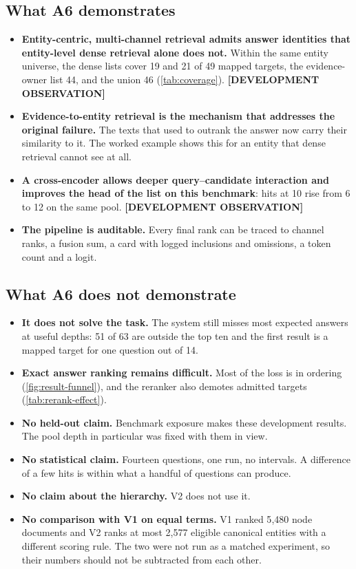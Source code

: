 \documentclass[11pt,a4paper]{article}
\newcommand{\cref}[1]{\autoref{#1}}
\theoremstyle{remark}
\newcommand{\vtag}[2]{{\sffamily\scriptsize\bfseries\textcolor{#1}{[#2]}}}
\newcommand{\Otag}{\vtag{warnline}{DEVELOPMENT OBSERVATION}}
\begin{document}
\subsection{What A6 demonstrates}

\begin{itemize}
  \item \textbf{Entity-centric, multi-channel retrieval admits answer identities that
        entity-level dense retrieval alone does not.} Within the same entity universe, the
        dense lists cover 19 and 21 of 49 mapped targets, the evidence-owner list 44, and
        the union 46 (\cref{tab:coverage}). \Otag
  \item \textbf{Evidence-to-entity retrieval is the mechanism that addresses the original
        failure.} The texts that used to outrank the answer now carry their similarity to
        it. The worked example shows this for an entity that dense retrieval cannot see at
        all.
  \item \textbf{A cross-encoder allows deeper query--candidate interaction and improves
        the head of the list on this benchmark}: hits at 10 rise from 6 to 12 on the same
        pool. \Otag
  \item \textbf{The pipeline is auditable.} Every final rank can be traced to channel
        ranks, a fusion sum, a card with logged inclusions and omissions, a token count
        and a logit.
\end{itemize}

\subsection{What A6 does not demonstrate}

\begin{itemize}
  \item \textbf{It does not solve the task.} The system still misses most expected
        answers at useful depths: 51 of 63 are outside the top ten and the first result
        is a mapped target for one question out of 14.
  \item \textbf{Exact answer ranking remains difficult.} Most of the loss is in ordering
        (\cref{fig:result-funnel}), and the reranker also demotes admitted targets
        (\cref{tab:rerank-effect}).
  \item \textbf{No held-out claim.} Benchmark exposure makes these development results.
        The pool depth in particular was fixed with them in view.
  \item \textbf{No statistical claim.} Fourteen questions, one run, no intervals. A
        difference of a few hits is within what a handful of questions can produce.
  \item \textbf{No claim about the hierarchy.} V2 does not use it.
  \item \textbf{No comparison with V1 on equal terms.} V1 ranked 5{,}480 node documents and
        V2 ranks at most 2{,}577 eligible canonical entities with a different scoring
        rule. The two were not run as a matched experiment, so their numbers should not
        be subtracted from each other.
\end{itemize}
\end{document}
